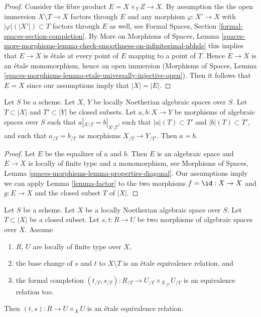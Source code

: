 \begin{proof}
Consider the fibre product $E = X \times_Y Z \to X$.
By assumption the the open immersion $X \setminus T \to X$
factors through $E$ and any morphism $\varphi : X' \to X$ with
$|\varphi|(|X'|) \subset T$ factors through $E$ as well, see
Formal Spaces, Section \ref{formal-spaces-section-completion}.
By More on Morphisms of Spaces, Lemma
\ref{spaces-more-morphisms-lemma-check-smoothness-on-infinitesimal-nbhds}
this implies that $E \to X$ is \'etale at every point of $E$
mapping to a point of $T$. Hence $E \to X$ is an \'etale
monomorphism, hence an open immersion
(Morphisms of Spaces, Lemma
\ref{spaces-morphisms-lemma-etale-universally-injective-open}).
Then it follows that $E = X$ since our assumptions imply that $|X| = |E|$.
\end{proof}

\begin{lemma}
\label{lemma-faithful}
Let $S$ be a scheme. Let $X$, $Y$ be locally Noetherian algebraic spaces
over $S$. Let $T \subset |X|$ and $T' \subset |Y|$ be closed subsets.
Let $a, b : X \to Y$ be morphisms of algebraic spaces over $S$ such
that $a|_{X \setminus T} = b|_{X \setminus T}$, such that
$|a|(T) \subset T'$ and $|b|(T) \subset T'$, and such that
$a_{/T} = b_{/T}$ as morphisms $X_{/T} \to Y_{/T'}$.
Then $a = b$.
\end{lemma}

\begin{proof}
Let $E$ be the equalizer of $a$ and $b$. Then $E$ is an algebraic space
and $E \to X$ is locally of finite type and a monomorphism, see
Morphisms of Spaces, Lemma \ref{spaces-morphisms-lemma-properties-diagonal}.
Our assumptions imply we can apply Lemma \ref{lemma-factor} to the two
morphisms $f = \id : X \to X$ and $g : E \to X$ and the closed
subset $T$ of $|X|$.
\end{proof}

\begin{lemma}
\label{lemma-equivalence-relation}
Let $S$ be a scheme. Let $X$ be a locally Noetherian algebraic space
over $S$. Let $T \subset |X|$ be a closed subset.
Let $s, t : R \to U$ be two morphisms of algebraic spaces over $X$.
Assume
\begin{enumerate}
\item $R$, $U$ are locally of finite type over $X$,
\item the base change of $s$ and $t$ to $X \setminus T$
is an \'etale equivalence relation, and
\item the formal completion
$(t_{/T}, s_{/T}) : R_{/T} \to U_{/T} \times_{X_{/T}} U_{/T}$
is an equivalence relation too.
\end{enumerate}
Then $(t, s) : R \to U \times_X U$ is an \'etale equivalence relation.
\end{lemma}

